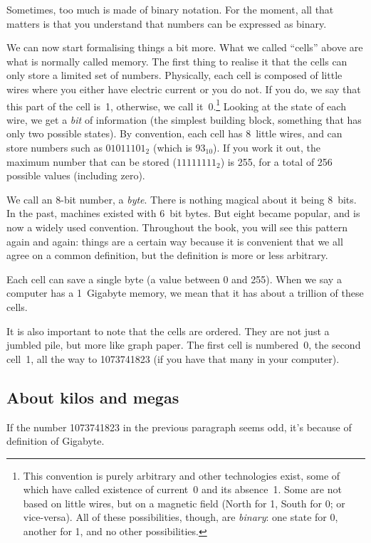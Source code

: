 Sometimes, too much is made of binary notation. For the moment, all that
matters is that you understand that numbers can be expressed as
binary.

We can now start formalising things a bit more. What we called ``cells'' above
are what is normally called memory. The first thing to realise it that the
cells can only store a limited set of numbers. Physically, each cell is
composed of little wires where you either have electric current or you do not.
If you do, we say that this part of the cell is~1, otherwise, we call
it~0.\footnote{This convention is purely arbitrary and other technologies
exist, some of which have called existence of current~0 and its absence~1. Some
are not based on little wires, but on a magnetic field (North for 1, South for
0; or vice-versa). All of these possibilities, though, are \emph{binary}: one
state for 0, another for 1, and no other possibilities.} Looking at the state
of each wire, we get a \emph{bit} of information (the simplest building block,
something that has only two possible states). By convention, each cell has
8~little wires, and can store numbers such as $01011101_2$ (which is
$93_{10}$). If you work it out, the maximum number that can be stored
($11111111_2$) is 255, for a total of 256 possible values (including zero).

We call an 8-bit number, a \emph{byte}. There is nothing magical about it being
8~bits. In the past, machines existed with 6~bit bytes. But eight became
popular, and is now a widely used convention. Throughout the book, you will see
this pattern again and again: things are a certain way because it is convenient
that we all agree on a common definition, but the definition is more or less
arbitrary.

Each cell can save a single byte (a value between 0 and 255). When we say a
computer has a 1~Gigabyte memory, we mean that it has about a trillion of these
cells.

It is also important to note that the cells are ordered. They are not just a
jumbled pile, but more like graph paper. The first cell is numbered~0, the
second cell~1, all the way to 1073741823 (if you have that many in your
computer).

\subsection{About kilos and megas}

If the number 1073741823 in the previous paragraph seems odd, it's because of
definition of Gigabyte.


